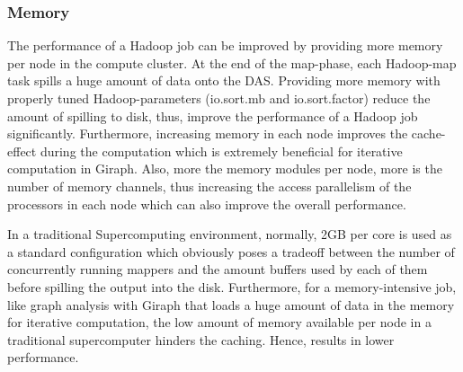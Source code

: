 \documentclass[conference]{IEEEtran}
\begin{document}
\subsubsection {Memory}
The performance of a Hadoop job can be improved by providing more memory per node in the compute cluster. 
At the end of the map-phase, each Hadoop-map task spills a huge amount of data onto the DAS. 
Providing more memory with properly tuned Hadoop-parameters (io.sort.mb and io.sort.factor) reduce the amount of spilling to disk, thus, improve the performance of a Hadoop job significantly.
Furthermore, increasing memory in each node improves the cache-effect during the computation which is extremely beneficial for iterative computation in Giraph.
Also, more the memory modules per node, more is the number of memory channels, thus increasing the access parallelism of the processors in each node which can also improve the overall performance.

In a traditional Supercomputing environment, normally, 2GB per core is used as a standard configuration which obviously poses a tradeoff between the number of concurrently running mappers and the amount buffers used by each of them before spilling the output into the disk. 
Furthermore, for a memory-intensive job, like graph analysis with Giraph that loads a huge amount of data in the memory for iterative computation, the low amount of memory available per node in a traditional supercomputer hinders the caching. Hence, results in lower performance.

\end{document}
